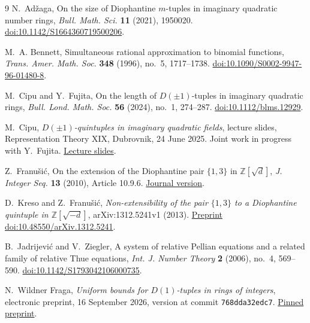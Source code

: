 \documentclass[12pt]{article}
\numberwithin{equation}{section}
\begin{document}
\begin{thebibliography}{9}
 N.~Ad\v zaga, On the size of Diophantine $m$-tuples in
imaginary quadratic number rings, \emph{Bull. Math. Sci.} \textbf{11}
(2021), 1950020.
\href{https://doi.org/10.1142/S1664360719500206}{doi:10.1142/S1664360719500206}.

 M.~A. Bennett, Simultaneous rational approximation
to binomial functions, \emph{Trans. Amer. Math. Soc.} \textbf{348}
(1996), no.~5, 1717--1738.
\href{https://doi.org/10.1090/S0002-9947-96-01480-8}{doi:10.1090/S0002-9947-96-01480-8}.

 M.~Cipu and Y.~Fujita, On the length of $D(\pm1)$-tuples
in imaginary quadratic rings, \emph{Bull. Lond. Math. Soc.}
\textbf{56} (2024), no.~1, 274--287.
\href{https://doi.org/10.1112/blms.12929}{doi:10.1112/blms.12929}.

 M.~Cipu, \emph{$D(\pm1)$-quintuples in imaginary
quadratic fields}, lecture slides, Representation Theory XIX,
Dubrovnik, 24 June 2025. Joint work in progress with Y.~Fujita.
\href{https://web.math.pmf.unizg.hr/~congress/Dubrovnik25/Slides-NT-25/Cipu.pdf}{Lecture slides}.

 Z.~Franu\v{s}i\'c, On the extension of the Diophantine
pair $\{1,3\}$ in $\mathbb Z[\sqrt d]$, \emph{J. Integer Seq.}
\textbf{13} (2010), Article 10.9.6.
\href{https://cs.uwaterloo.ca/journals/JIS/VOL13/Franusic/franusic4.html}{Journal version}.

 D.~Kreso and Z.~Franu\v{s}i\'c, \emph{Non-extensibility
of the pair $\{1,3\}$ to a Diophantine quintuple in
$\mathbb Z[\sqrt{-d}]$}, arXiv:1312.5241v1 (2013).
\href{https://doi.org/10.48550/arXiv.1312.5241}{Preprint doi:10.48550/arXiv.1312.5241}.

 B.~Jadrijevi\'c and V.~Ziegler, A system of relative
Pellian equations and a related family of relative Thue equations,
\emph{Int. J. Number Theory} \textbf{2} (2006), no.~4, 569--590.
\href{https://doi.org/10.1142/S1793042106000735}{doi:10.1142/S1793042106000735}.

 N.~Wildner Fraga, \emph{Uniform bounds for $D(1)$-tuples in
rings of integers}, electronic preprint, 16 September 2026,
version at commit \texttt{768dda32edc7}.
\href{https://github.com/natanaelwf/Solving-Open-Problems/blob/768dda32edc7166f9dd094b419df250b1e008531/dujella-problems-1.12-1.13/README.md}{Pinned preprint}.
\end{thebibliography}
\end{document}

